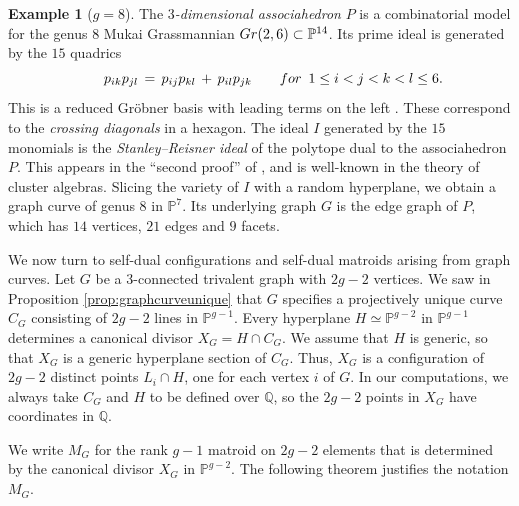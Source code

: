 \documentclass[12pt]{extarticle}
\theoremstyle{definition}
\newtheorem{example}[theorem]{Example}
\numberwithin{theorem}{section}
\theoremstyle{plain}\newtheorem{ithm}{Theorem}
\newcommand{\PP}{\mathbb{P}}
\newcommand{\QQ}{\mathbb{Q}}
\begin{document}
\begin{example}[$g=8$] The {\em $3$-dimensional
  associahedron} $P$ is a combinatorial model for the genus $8$ Mukai Grassmannian
   ${\rm Gr}(2,6) \subset \PP^{14}$. Its prime ideal is
  generated by the $15$ quadrics
    $$ \qquad p_{ik} p_{jl} \, = \, p_{ij} p_{kl} \,+ \, p_{il} p_{jk} \qquad {\rm for} \,\,\,
  1 \leq i <j < k < l \leq 6. $$
  This is a reduced Gr\"obner basis with leading terms on the left \cite[Theorem 5.8]{INLA}.
  These  correspond to the {\em crossing diagonals} in a hexagon.
  The ideal $I$ generated by the $15$ monomials is the \emph{Stanley--Reisner ideal} of the polytope dual
  to the associahedron $P$. This appears in
  the ``second proof'' of \cite[Proposition 3.7.4]{AIT}, and is
  well-known in the theory of cluster algebras.
  Slicing the variety of $I$ with a random hyperplane, we obtain a graph curve of genus $8$ in $\PP^7$.
  Its underlying graph $G$ is the edge graph of $P$, which has $14$ vertices, $21$ edges and $9$ facets.
  \end{example}

We now turn to  self-dual configurations and self-dual matroids
arising from graph curves. Let $G$ be a 
$3$-connected trivalent graph with $2g-2$ vertices.
We saw in Proposition  \ref{prop:graphcurveunique}
that $G$ specifies a projectively unique curve $C_G$ consisting
of $2g-2$ lines in $\PP^{g-1}$.
Every hyperplane $H \simeq \PP^{g-2}$ in $\PP^{g-1}$
determines a canonical divisor  $X_G = H \cap C_G$. 
We assume that $H$ is generic, so that $X_G$
is a generic hyperplane section of $C_G$. Thus, $X_G$ is a configuration of $2g-2$ distinct points $ L_i \cap H$, one for each vertex $i$ of $G$. 
In our computations,
we always take $C_G$ and $H$ to be defined over $\QQ$, so the
$2g-2$ points in $X_G$  have coordinates in $\QQ$.

We write $M_G$ for the rank $g-1$ matroid 
on $2g-2$ elements that is determined by the
canonical divisor $X_G$ in $\PP^{g-2}$. 
The following theorem justifies the notation $M_G$.
\end{document}
